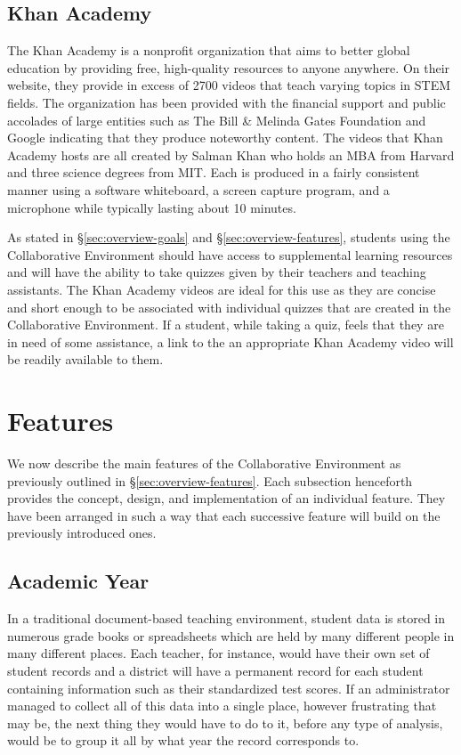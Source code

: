 \subsection{Khan Academy}
The Khan Academy is a nonprofit organization that aims to better global education by providing free, high-quality resources to anyone anywhere. \cite{khan-website-about} On their website, they provide in excess of 2700 videos that teach varying topics in STEM fields. The organization has been provided with the financial support and public accolades of large entities such as The Bill \& Melinda Gates Foundation and Google \cite{khan-wiki-sources} indicating that they produce noteworthy content. The videos that Khan Academy hosts are all created by Salman Khan who holds an MBA from Harvard and three science degrees from MIT. Each is produced in a fairly consistent manner using a software whiteboard, a screen capture program, and a microphone while typically lasting about 10 minutes.

As stated in \S \ref{sec:overview-goals} and \S \ref{sec:overview-features}, students using the Collaborative Environment should have access to supplemental learning resources and will have the ability to take quizzes given by their teachers and teaching assistants. The Khan Academy videos are ideal for this use as they are concise and short enough to be associated with individual quizzes that are created in the Collaborative Environment. If a student, while taking a quiz, feels that they are in need of some assistance, a link to the an appropriate Khan Academy video will be readily available to them.

\section{Features}
\label{sec:design-features}
We now describe the main features of the Collaborative Environment as previously outlined in \S \ref{sec:overview-features}. Each subsection henceforth provides the concept, design, and implementation of an individual feature. They have been arranged in such a way that each successive feature will build on the previously introduced ones.

\subsection{Academic Year}
\label{subsec:design-year}
In a traditional document-based teaching environment, student data is stored in numerous grade books  or spreadsheets which are held by many different people in many different places. Each teacher, for instance, would have their own set of student records and a district will have a permanent record for each student containing information such as their standardized test scores. If an administrator managed to collect all of this data into a single place, however frustrating that may be, the next thing they would have to do to it, before any type of analysis, would be to group it all by what year the record corresponds to.

